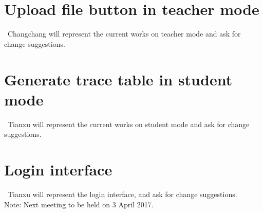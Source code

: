 \documentclass[11pt, a4paper]{article}
\begin{document}
\section{Upload file button in teacher mode}
\ Changchang will represent the current works on teacher mode and ask for change suggestions. \\

\section{Generate trace table in student mode}
\ Tianxu will represent the current works on student mode and ask for change suggestions.\\

\section{Login interface}
\ Tianxu will represent the login interface, and ask for change suggestions.\\


\vspace*{10pt}
\noindent Note: Next meeting to be held on 3 April 2017.
\end{document}
